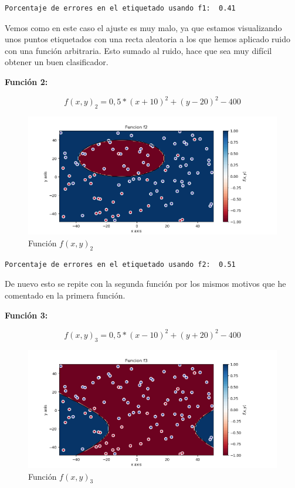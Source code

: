 \documentclass[12pt, spanish]{article}
\begin{document}
\begin{lstlisting}
Porcentaje de errores en el etiquetado usando f1:  0.41
\end{lstlisting}

Vemos como en este caso el ajuste es muy malo, ya que estamos visualizando unos puntos etiquetados con una recta aleatoria a los que hemos aplicado ruido con una función arbitraria. Esto sumado al ruido, hace que sea muy difícil obtener un buen clasificador.

\textbf{Función 2:} 

$$ f(x, y)_2 = 0,5*(x + 10)^2 + (y - 20)^2 - 400  $$

\begin{figure}[H]
  \centering
      \includegraphics[scale = 0.70]{ej1-3-f2.png}
 		 \caption{Función $f(x, y)_2$}
  		\label{fig:ej1-f2}

\end{figure}

\begin{lstlisting}
Porcentaje de errores en el etiquetado usando f2:  0.51
\end{lstlisting}

De nuevo esto se repite con la segunda función por los mismos motivos que he comentado en la primera función.


\textbf{Función 3:} 

$$ f(x, y)_3 = 0,5*(x - 10)^2 + (y + 20)^2 - 400 $$

\begin{figure}[H]
  \centering
      \includegraphics[scale = 0.70]{ej1-3-f3.png}
 		 \caption{Función $f(x, y)_3$}
  		\label{fig:ej1-f3}

\end{figure}
\end{document}
